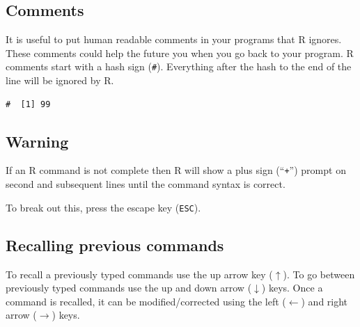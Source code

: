 \documentclass[a4paper,9pt,twocolumn,twoside,printwatermark=false]{pinp}
\begin{document}
\subsection{Comments}\label{comments}

It is useful to put human readable comments in your programs that R
ignores. These comments could help the future you when you go back to
your program. R comments start with a hash sign (\texttt{\#}).
Everything after the hash to the end of the line will be ignored by R.

\begin{Shaded}
\begin{Highlighting}[]
\end{Highlighting}
\end{Shaded}

\begin{ShadedResult}
\begin{verbatim}
#  [1] 99
\end{verbatim}
\end{ShadedResult}

\subsection{Warning}\label{warning}

If an R command is not complete then R will show a plus sign
(``\texttt{+}'') prompt on second and subsequent lines until the command
syntax is correct.

\begin{Shaded}
\begin{Highlighting}[]
\OperatorTok{+}
\end{Highlighting}
\end{Shaded}

To break out this, press the escape key (\texttt{ESC}).

\subsection{Recalling previous
commands}\label{recalling-previous-commands}

To recall a previously typed commands use the up arrow key
(\(\uparrow\)). To go between previously typed commands use the up and
down arrow (\(\downarrow\)) keys. Once a command is recalled, it can be
modified/corrected using the left (\(\leftarrow\)) and right arrow
(\(\rightarrow\)) keys.
\end{document}
